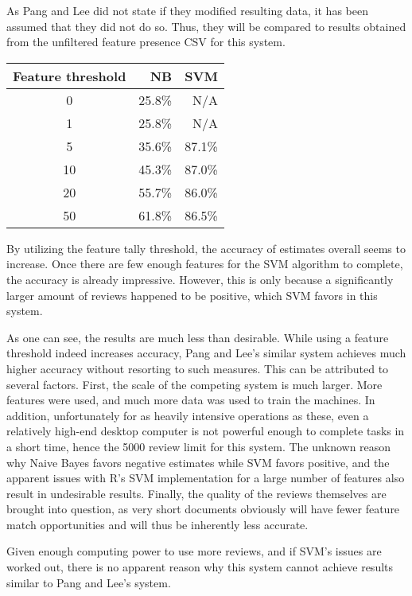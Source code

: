 As Pang and Lee did not state if they modified resulting data, it has been assumed that they did not do so. Thus, they will be compared to results obtained from the unfiltered feature presence CSV for this system.

\begin{center}
\begin{tabular}{ | c || r | r | }
    \hline
    Feature threshold & NB & SVM \\ \hline
    0 & 25.8\% & N/A \\ \hline
    1 & 25.8\% & N/A \\ \hline
    5 & 35.6\% & 87.1\% \\ \hline
    10 & 45.3\% & 87.0\% \\ \hline
    20 & 55.7\% & 86.0\% \\ \hline
    50 & 61.8\% & 86.5\% \\
    \hline
\end{tabular}
\end{center}

By utilizing the feature tally threshold, the accuracy of estimates overall seems to increase. Once there are few enough features for the SVM algorithm to complete, the accuracy is already impressive. However, this is only because a significantly larger amount of reviews happened to be positive, which SVM favors in this system.

As one can see, the results are much less than desirable. While using a feature threshold indeed increases accuracy, Pang and Lee's similar system achieves much higher accuracy without resorting to such measures. This can be attributed to several factors. First, the scale of the competing system is much larger. More features were used, and much more data was used to train the machines. In addition, unfortunately for as heavily intensive operations as these, even a relatively high-end desktop computer is not powerful enough to complete tasks in a short time, hence the 5000 review limit for this system. The unknown reason why Naive Bayes favors negative estimates while SVM favors positive, and the apparent issues with R's SVM implementation for a large number of features also result in undesirable results. Finally, the quality of the reviews themselves are brought into question, as very short documents obviously will have fewer feature match opportunities and will thus be inherently less accurate.

Given enough computing power to use more reviews, and if SVM's issues are worked out, there is no apparent reason why this system cannot achieve results similar to Pang and Lee's system. 
